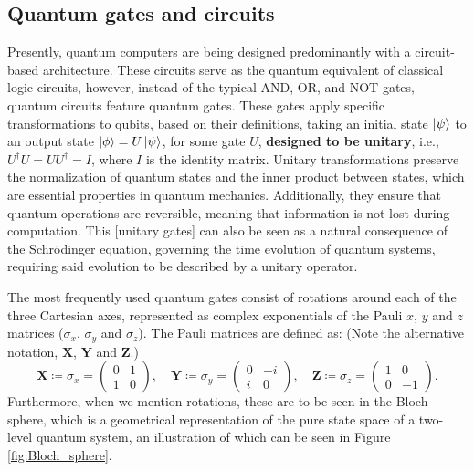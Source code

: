 \subsection*{Quantum gates and circuits}
\vspace*{-2.5mm}
Presently, quantum computers are being designed predominantly with a circuit-based architecture. These circuits serve as the quantum equivalent of classical logic circuits, however, instead of the typical AND, OR, and NOT gates, quantum circuits feature quantum gates. These gates apply specific transformations to qubits, based on their definitions, taking an initial state $\ket{\psi}$ to an output state $\ket{\phi} = U\ket{\psi}$, for some gate $U$, \textbf{designed to be unitary}, i.e., $U^{\dagger}U = UU^{\dagger} = I$, where $I$ is the identity matrix. Unitary transformations preserve the normalization of quantum states and the inner product between states, which are essential properties in quantum mechanics. Additionally, they ensure that quantum operations are reversible, meaning that information is not lost during computation. This [unitary gates] can also be seen as a natural consequence of the Schrödinger equation, governing the time evolution of quantum systems, requiring said evolution to be described by a unitary operator.

The most frequently used quantum gates consist of rotations around each of the three Cartesian axes, represented as complex exponentials of the Pauli $x$, $y$ and $z$ matrices ($\sigma_x$, $\sigma_y$ and $\sigma_z$). The Pauli matrices are defined as: (Note the alternative notation, $\boldsymbol{X}$, $\boldsymbol{Y}$ and $\boldsymbol{Z}$.)
\begin{equation}
  \boldsymbol{X} \coloneq \sigma_x =
  \begin{pmatrix}
    0 & 1 \\
    1 & 0
  \end{pmatrix},
  \quad
  \boldsymbol{Y} \coloneq \sigma_y =
  \begin{pmatrix}
    0 & -i \\
    i & 0
  \end{pmatrix},
  \quad
  \boldsymbol{Z} \coloneq \sigma_z =
  \begin{pmatrix}
    1 & 0 \\
    0 & -1
  \end{pmatrix}.
\end{equation}
Furthermore, when we mention rotations, these are to be seen in the Bloch sphere, which is a geometrical representation of the pure state space of a two-level quantum system, an illustration of which can be seen in Figure \ref{fig:Bloch_sphere}.

